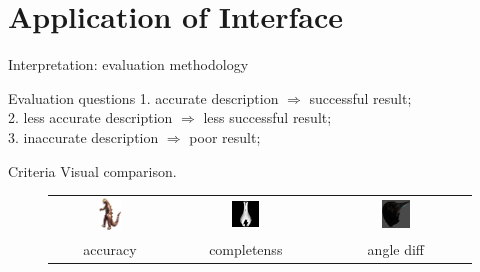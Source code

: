 \documentclass[10pt]{beamer}
\begin{document}
\section{Application of Interface}
\begin{frame}{Interpretation: evaluation methodology}

\begin{exampleblock}{Evaluation questions}
  1. accurate description $\Rightarrow$ successful result; \\
  2. less accurate description $\Rightarrow$ less successful result;\\
  3. inaccurate description $\Rightarrow$ poor result; \\
\end{exampleblock}

\begin{exampleblock}{Criteria}
  Visual comparison.
\end{exampleblock}

\begin{figure}
\centering
\begin{tabular}{ccc}
\includegraphics[width=0.2\textwidth]{images/dino.png} &
\includegraphics[width=0.2\textwidth]{interp/synth_interp/vase0_sl} &
\includegraphics[width=0.2\textwidth]{interp/real_interp/vase/vase_spike} \\
accuracy & completenss & angle diff \\
\end{tabular}
\end{figure}

\end{frame}
\end{document}
